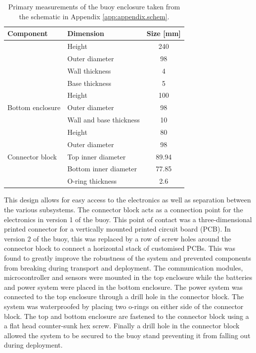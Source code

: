 \begin{table}[H]
	\centering
	\caption{Primary measurements of the buoy enclosure taken from the schematic in Appendix \ref{app:appendix.schem}.}
	\setlength{\extrarowheight}{5pt}
	\begin{tabular}{l  l c}
		\hline
		\textbf{Component} &   \textbf{Dimension} &   \textbf{Size [mm]} \\
		\hline
		\hline
		\setlength{\extrarowheight}{2.5pt}
		\multirow{4}{*}{Top enclosure} & Height & 240\\
		&  Outer diameter & 98  \\
		&  Wall thickness & 4 \\ 
		&  Base thickness & 5 \\
		\hline
		\multirow{3}{*}{Bottom enclosure} & Height & 100\\
		& Outer diameter & 98  \\
		& Wall and base thickness & 10 \\ 
		\hline
		\multirow{5}{*}{Connector block} & Height & 80\\
		&  Outer diameter & 98  \\
		&  Top inner diameter & 89.94  \\ 
		&  Bottom inner diameter & 77.85\\
		&  O-ring thickness & 2.6 \\
		\hline
		\hline
	\end{tabular}
	
	\label{tab:enc_meas}
\end{table}

This design allows for easy access to the electronics as well as separation between the various subsystems. The connector block acts as a connection point for the electronics in version 1 of the buoy. This point of contact was a three-dimensional printed connector for a vertically mounted printed circuit board (PCB). In version 2 of the buoy, this was replaced by a row of screw holes around the connector block to connect a horizontal stack of customised PCBs. This was found to greatly improve the robustness of the system and prevented components from breaking during transport and deployment. The communication modules, microcontroller and sensors were mounted in the top enclosure while the batteries and power system were placed in the bottom enclosure. The power system was connected to the top enclosure through a drill hole in the connector block. The system was waterproofed by placing two o-rings on either side of the connector block. The top and bottom enclosure are fastened to the connector block using a a flat head counter-sunk hex screw. Finally a drill hole in the connector block allowed the system to be secured to the buoy stand preventing it from falling out during deployment.

